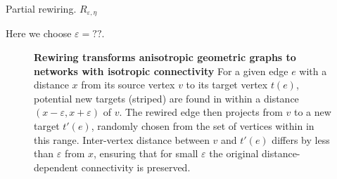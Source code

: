 

\begin{remark}
Partial rewiring. $R_{\varepsilon, \eta}$
\end{remark} 

Here we choose $\varepsilon = ??$.

\vspace{0.2cm}
\begin{figure}[H]
  \centering 
  \caption{\textbf{Rewiring transforms anisotropic geometric graphs to
      networks with isotropic connectivity} For a given edge $e$ with
    a distance $x$ from its source vertex $v$ to its target vertex
    $t(e)$, potential new targets (striped) are found in within a
    distance $(x-\varepsilon, x+\varepsilon)$ of $v$. The rewired edge
    then projects from $v$ to a new target $t'(e)$, randomly chosen
    from the set of vertices within in this range. Inter-vertex
    distance between $v$ and $t'(e)$ differs by less than
    $\varepsilon$ from $x$, ensuring that for small $\varepsilon$ the
    original distance-dependent connectivity is preserved.}
  \label{fig:distance_rewiring}
\end{figure}

 




